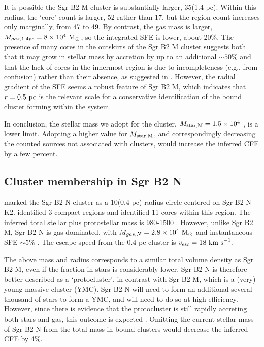 \documentclass[twocolumn]{aastex62}
\begin{document}

It is possible the Sgr B2 M cluster is substantially larger, 35\arcsec (1.4 pc).
Within this radius, the `core' count is larger, 52 rather than 17, but the \hii
region count increases only marginally, from 47 to 49.  By contrast,
the gas mass is larger, $M_{gas,1.4pc} = 8\times10^{4}~\mathrm{M}_{\odot}$, so the integrated SFE is lower,
about 20\%.  
The presence of many cores in the outskirts of the Sgr B2 M cluster suggests
both that it may grow in stellar mass by accretion by up to an additional
$\sim50\%$ and that the lack of cores in the innermost region is due to
incompleteness (e.g., from confusion) rather than their absence, as suggested
in \citet{Ginsburg2018a}. However, the radial gradient of the SFE seems a
robust feature of Sgr B2 M, which indicates that $r=0.5~\mathrm{pc}$ is the relevant
scale for a conservative identification of the bound cluster forming within the
system.

In conclusion, the stellar mass we adopt for the cluster, $M_{\rm star,M}=1.5\times10^{4}$ \msun, is
a lower limit.  Adopting a higher value for $M_{\rm star,M}$, and correspondingly decreasing
the counted sources not associated with clusters, would increase the inferred
CFE by a few percent.

\subsection{Cluster membership in Sgr B2 N}
\citet{Schmiedeke2016a} marked the Sgr B2 N cluster as a 10\arcsec  (0.4 pc) radius circle
centered on Sgr B2 N K2.  \citet{Schmiedeke2016a} identified 3 compact \hii regions
and \citet{Ginsburg2018a} identified 11 cores within this region.  The inferred
total stellar plus protostellar mass is 980-1500 \msun.  However, unlike Sgr B2
M, Sgr B2 N is gas-dominated, with $M_{gas,N} = 2.8\times10^{4}~\mathrm{M}_{\odot}$ and
instantaneous SFE $\sim5\%$ \citep{Schmiedeke2016a}.  The escape speed from the
0.4 pc cluster is
$v_{\rm esc} = 18~\textrm{km~s}^{-1}$.

The above mass and radius corresponds to a similar total volume density as Sgr
B2 M, even if the fraction in stars is considerably lower. Sgr B2 N is
therefore better described as a `protocluster', in contrast with
Sgr B2 M, which is a (very) young massive cluster (YMC).  Sgr B2 N will need to
form an additional several thousand \msun of stars to form a YMC, and will need
to do so at high efficiency.  However, since there is evidence that the
protocluster is still rapidly accreting both stars and gas, this outcome
is expected \citep[cf.][]{Ginsburg2016b}. Omitting the current stellar mass of
Sgr B2 N from the total mass in bound clusters would decrease the inferred CFE
by 4\%.
\end{document}
